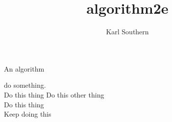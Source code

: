 \documentclass[]{article}
\title{algorithm2e}
\author{Karl Southern}
\begin{document}
\begin{algorithm}[H]
	\caption{An algorithm\label{algo}}
	$ $
	\\
	{
		do something.
	}
	$ $
	\\
	{Do this thing}
	{Do this other thing}
	$ $
	\\
	{Do this thing}
	$ $
	\\
	{Keep doing this}
	\end{algorithm}
\end{document}

